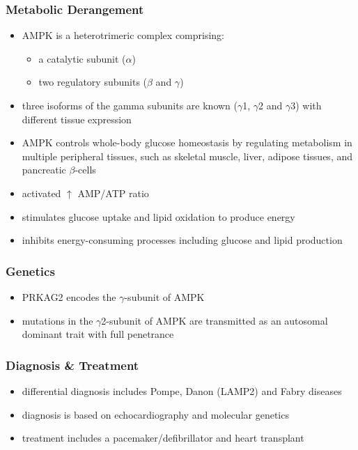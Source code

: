 \documentclass{scrartcl}
\begin{document}
\subsubsection{Metabolic Derangement}
\label{sec:orgdacfa88}
\begin{itemize}
\item AMPK is a heterotrimeric complex comprising:
\begin{itemize}
\item a catalytic subunit (\(\alpha\))
\item two regulatory subunits (\(\beta\) and \(\gamma\))
\end{itemize}
\item three isoforms of the gamma subunits are known (\(\gamma\)1, \(\gamma\)2 and \(\gamma\)3) with different tissue
expression
\item AMPK controls whole-body glucose homeostasis by regulating metabolism in multiple peripheral tissues, such as
skeletal muscle, liver, adipose tissues, and pancreatic \(\beta\)-cells
\item activated \(\uparrow\) AMP/ATP ratio
\item stimulates glucose uptake and lipid oxidation to produce energy
\item inhibits energy-consuming processes including glucose and lipid production
\end{itemize}
\subsubsection{Genetics}
\label{sec:orge687295}
\begin{itemize}
\item PRKAG2 encodes the \(\gamma\)-subunit of AMPK
\item mutations in the \(\gamma\)2-subunit of AMPK are transmitted as an
autosomal dominant trait with full penetrance
\end{itemize}

\subsubsection{Diagnosis \& Treatment}
\label{sec:orgdf54d85}
\begin{itemize}
\item differential diagnosis includes Pompe, Danon (LAMP2) and Fabry diseases
\item diagnosis is based on echocardiography and molecular genetics
\item treatment includes a pacemaker/defibrillator and heart transplant
\end{itemize}
\end{document}
